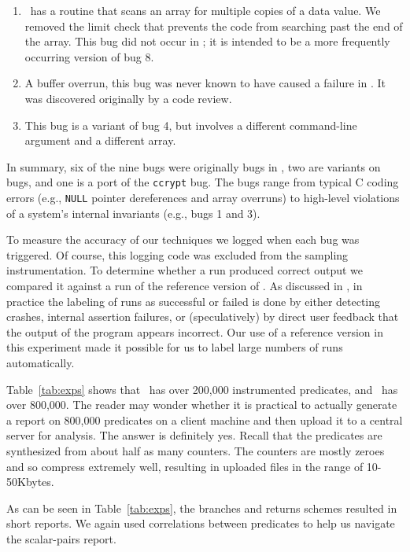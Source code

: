 \begin{enumerate}
\item \moss\ has a routine that scans an array for multiple copies of a data value.
We removed the limit check that prevents the code from searching past the end of the array.  
This bug did not occur in \moss; it is intended to be a more frequently occurring version of bug 8.

\item  A buffer overrun, this bug was never known to have caused a failure in \moss. It
was discovered originally by a code review.

\item This bug is a variant of bug 4, but involves a different command-line argument and
a different array.
\end{enumerate}

In summary, six of the nine bugs were originally bugs in \moss, two are variants on \moss bugs, and one
is a port of the {\tt ccrypt} bug.  The bugs
range from typical C coding errors (e.g., \texttt{NULL} pointer dereferences
and array overruns) to high-level violations of a system's internal
invariants (e.g., bugs 1 and 3).

To measure the accuracy of our techniques we logged 
when each bug was triggered.  Of course, this logging 
code was excluded from the sampling instrumentation.
To determine whether a run produced correct output we compared it against a run
of the reference version of \moss.  As discussed in ,
in practice the labeling of runs as successful or failed is done by either detecting
crashes, internal assertion failures, or (speculatively) by direct user feedback that the output
of the program appears incorrect.  Our use of a reference version in this experiment made
it possible for us to label large numbers of runs automatically.

Table~\ref{tab:exps} shows that \moss\ has over 200,000 instrumented predicates,
and \rhythmbox\ has over 800,000.
The reader may wonder whether it is practical to actually generate a report on
800,000 predicates on a client machine and then upload it to a central
server for analysis.  The answer is definitely yes.  Recall
that the predicates are synthesized from about half as many counters.
The counters are mostly zeroes and so compress extremely well,
resulting in uploaded files in the range of 10-50Kbytes.

As can be seen in Table~\ref{tab:exps}, the branches and returns schemes
resulted in short reports.  We again used correlations between predicates to help us navigate
the scalar-pairs report.

